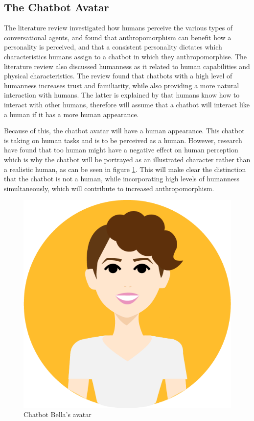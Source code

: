         
\vspace{5mm}

    \subsection{The Chatbot Avatar}
    The literature review investigated how humans perceive the various types of conversational agents, and found that anthropomorphism can benefit how a personality is perceived, and that a consistent personality dictates which characteristics humans assign to a chatbot in which they anthropomorphise. The literature review also discussed humanness as it related to human capabilities and physical characteristics. The review found that chatbots with a high level of humanness increases trust and familiarity, while also providing a more natural interaction with humans. The latter is explained by that humans know how to interact with other humans, therefore will assume that a chatbot will interact like a human if it has a more human appearance. 
        
    Because of this, the chatbot avatar will have a human appearance. This chatbot is taking on human tasks and is to be perceived as a human. However, research have found that too human might have a negative effect on human perception which is why the chatbot will be portrayed as an illustrated character rather than a realistic human, as can be seen in figure \ref{fig:avatar}. This will make clear the distinction that the chatbot is not a human, while incorporating high levels of humanness simultaneously, which will contribute to increased anthropomorphism.
    
    \begin{figure}[H]
        \centering
        \includegraphics[scale=0.35]{figures/Bella_avatar.png}
        \caption{Chatbot Bella's avatar}
        \label{fig:avatar}
    \end{figure}
    
